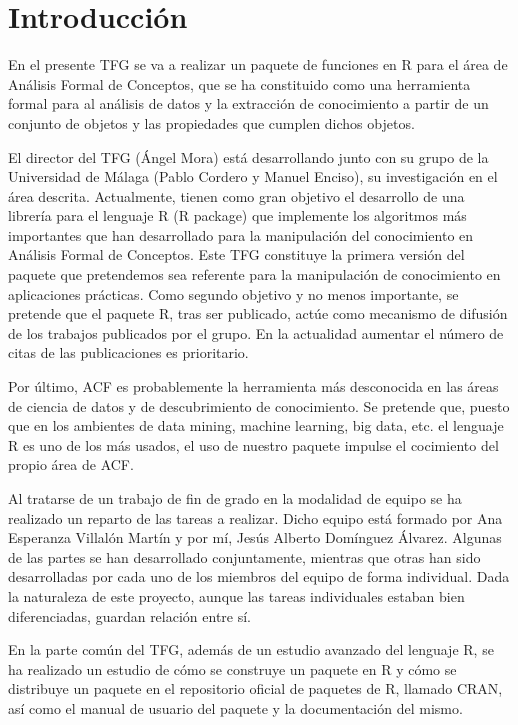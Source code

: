 \section{Introducci\'on}

En el presente TFG se va a realizar un paquete de funciones en R para el \'area de An\'alisis Formal de Conceptos, que se ha constituido como una herramienta formal para al an\'alisis de datos y la extracci\'on de conocimiento a partir de un conjunto de objetos y las propiedades que cumplen dichos objetos.

El director del TFG (\'Angel Mora) est\'a desarrollando junto con su grupo de la Universidad de M\'alaga (Pablo Cordero y Manuel Enciso), su investigaci\'on en el \'area descrita. Actualmente, tienen como gran objetivo el desarrollo de una librer\'ia para el lenguaje R (R package) que implemente los algoritmos m\'as importantes que han desarrollado para la manipulaci\'on del conocimiento en  An\'alisis Formal de Conceptos. Este TFG constituye la primera versi\'on del paquete que pretendemos sea referente para la manipulaci\'on de conocimiento en aplicaciones pr\'acticas. Como segundo objetivo y no menos importante, se pretende que el paquete R, tras ser publicado, act\'ue como mecanismo de difusi\'on de los trabajos publicados por el grupo. En la actualidad aumentar el n\'umero de citas de las publicaciones es prioritario. 

Por \'ultimo, ACF es probablemente la herramienta m\'as desconocida en las \'areas de ciencia de datos y de descubrimiento de conocimiento. Se pretende que, puesto que en los ambientes de data mining, machine learning, big data, etc. el lenguaje R es uno de los m\'as usados, el uso de nuestro paquete impulse el cocimiento del propio \'area de ACF.

Al tratarse de un trabajo de fin de grado en la modalidad de equipo se ha realizado un reparto de las tareas a realizar. Dicho equipo est\'a formado por Ana Esperanza Villal\'on Mart\'in y por m\'i, Jes\'us Alberto Dom\'inguez \'Alvarez. Algunas de las partes se han desarrollado conjuntamente, mientras que otras han sido desarrolladas por cada uno de los miembros del equipo de forma individual. Dada la naturaleza de este proyecto, aunque las tareas individuales estaban bien diferenciadas, guardan relaci\'on entre s\'i.

En la parte com\'un del TFG, adem\'as de un estudio avanzado del lenguaje R, se ha realizado un estudio de c\'omo se construye un paquete en R y c\'omo se distribuye un paquete en el repositorio oficial de paquetes de R, llamado CRAN, as\'i como el manual de usuario del paquete y la documentaci\'on del mismo.

